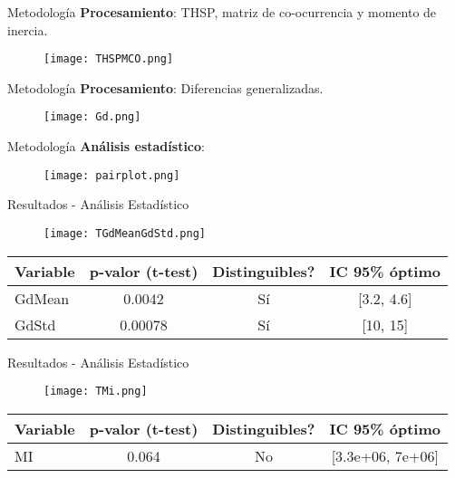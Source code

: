 \documentclass{beamer}
\begin{document}
\begin{frame}{Metodología}
    \textbf{Procesamiento}: THSP, matriz de co-ocurrencia y momento de inercia.
    \begin{figure}
        \texttt{[image: THSPMCO.png]}
    \end{figure}
\end{frame}

\begin{frame}{Metodología}
    \textbf{Procesamiento}: Diferencias generalizadas.
    \begin{figure}
        \texttt{[image: Gd.png]}
    \end{figure}

\end{frame}

\begin{frame}{Metodología}
    \textbf{Análisis estadístico}: 
    \begin{figure}
        \texttt{[image: pairplot.png]}
    \end{figure}

\end{frame}

\begin{frame}{Resultados - Análisis Estadístico}
    \begin{table}
        \centering
        \begin{figure}
            \texttt{[image: TGdMeanGdStd.png]}
        \end{figure}
        \begin{tabular}{|l|c|c|c|}
            \hline
            \textbf{Variable} & \textbf{p-valor (t-test)} & \textbf{Distinguibles?} & \textbf{IC 95\% óptimo} \\
            \hline
            GdMean & 0.0042 & Sí & [3.2, 4.6] \\
            GdStd & 0.00078 & Sí & [10, 15] \\
            \hline
        \end{tabular}
    \end{table}
\end{frame}

\begin{frame}{Resultados - Análisis Estadístico}
    \begin{table}
        \centering
        \begin{figure}
            \texttt{[image: TMi.png]}
        \end{figure}
        \begin{tabular}{|l|c|c|c|}
            \hline
            \textbf{Variable} & \textbf{p-valor (t-test)} & \textbf{Distinguibles?} & \textbf{IC 95\% óptimo} \\
            \hline
            MI & 0.064 & No & [3.3e+06, 7e+06] \\
            \hline
        \end{tabular}
    \end{table}
\end{frame}
\end{document}
